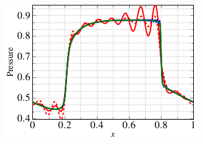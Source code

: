 \begin{figure}
\begin{subfigure}[]{0.47\linewidth}
\caption{}
\label{density_reduction_1D}
\end{subfigure} 
\begin{subfigure}[]{0.47\linewidth}
        \includegraphics[scale=1]{Figures/paper-figure20.pdf}

\end{subfigure}
\end{figure}
